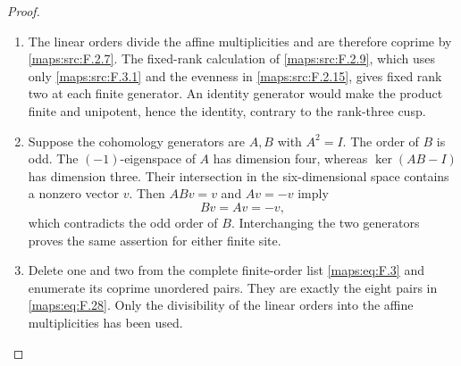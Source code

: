 \begin{proof}
\begin{enumerate}[label=\arabic*.]
\item The linear orders divide the affine multiplicities and are
therefore coprime by \ref{maps:src:F.2.7}.  The fixed-rank calculation
of \ref{maps:src:F.2.9}, which uses only \ref{maps:src:F.3.1} and the
evenness in \ref{maps:src:F.2.15}, gives fixed rank two at each finite
generator.  An identity generator would make the product finite and
unipotent, hence the identity, contrary to the rank-three cusp.

\item Suppose the cohomology generators are $A,B$ with $A^2=I$.
The order of $B$ is odd.  The $(-1)$-eigenspace of $A$ has dimension
four, whereas $\ker(AB-I)$ has dimension three.  Their intersection
in the six-dimensional space contains a nonzero vector $v$.
Then $ABv=v$ and $Av=-v$ imply
\[
 Bv=Av=-v,
\]
which contradicts the odd order of $B$.  Interchanging the two
generators proves the same assertion for either finite site.

\item Delete one and two from the complete finite-order list
\eqref{maps:eq:F.3} and enumerate its coprime unordered pairs.
They are exactly the eight pairs in \eqref{maps:eq:F.28}.
Only the divisibility of the linear orders into the affine
multiplicities has been used.
\end{enumerate}
\end{proof}




